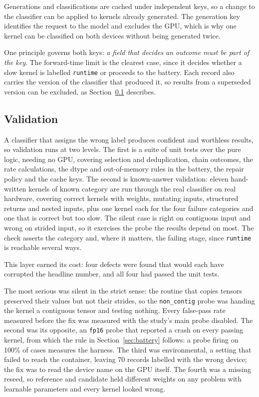 \documentclass[12pt]{article}
\begin{document}
Generations and classifications are cached under independent keys, so a change
to the classifier can be applied to kernels already generated. The generation
key identifies the request to the model and excludes the GPU, which is why one
kernel can be classified on both devices without being generated twice.

One principle governs both keys: \emph{a field that decides an outcome must be
part of the key}. The forward-time limit is the clearest case, since it decides
whether a slow kernel is labelled \texttt{runtime} or proceeds to the battery.
Each record also carries the version of the classifier that produced it, so
results from a superseded version can be excluded, as
Section~\ref{sec:validation} describes.

\subsection{Validation}
\label{sec:validation}

A classifier that assigns the wrong label produces confident and worthless
results, so validation runs at two levels. The first is a suite of unit tests
over the pure logic, needing no GPU, covering selection and deduplication,
chain outcomes, the rate calculations, the dtype and out-of-memory rules in the
battery, the repair policy and the cache keys. The second is known-answer
validation: eleven
hand-written kernels of known category are run through the real classifier on
real hardware, covering correct kernels with weights, mutating inputs,
structured returns and nested inputs, plus one kernel each for the four failure
categories and one that is correct but too slow. The silent case is right on
contiguous input and wrong on strided input, so it exercises the probe the
results depend on most. The check asserts the category and, where it matters,
the failing stage, since \texttt{runtime} is reachable several ways.

This layer earned its cost: four defects were found that would each have
corrupted the headline number, and all four had passed the unit tests.

The most serious was silent in the strict sense: the routine that copies
tensors preserved their values but not their strides, so the
\texttt{non\_contig} probe was handing the kernel a contiguous tensor and
testing nothing. Every false-pass rate measured before the fix was measured
with the study's main probe disabled. The second was its opposite, an
\texttt{fp16} probe that reported a crash on every passing kernel, from which
the rule in Section~\ref{sec:battery} follows: a probe firing on 100\% of cases
measures the harness. The third was environmental, a setting that failed to
reach the container, leaving 70 records labelled with the wrong device; the fix
was to read the device name on the GPU itself. The fourth was a missing reseed,
so reference and candidate held different weights on any problem with learnable
parameters and every kernel looked wrong.
\end{document}
